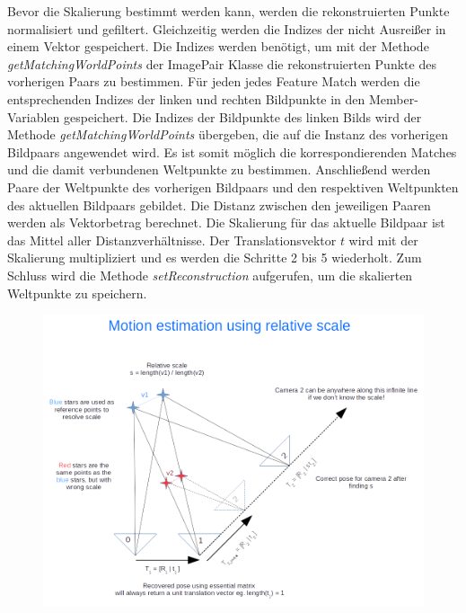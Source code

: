 Bevor die Skalierung bestimmt werden kann, werden die rekonstruierten Punkte normalisiert und gefiltert.
Gleichzeitig werden die Indizes der nicht Ausreißer in einem Vektor gespeichert. 
Die Indizes werden benötigt, um mit der Methode \emph{getMatchingWorldPoints} der ImagePair Klasse die rekonstruierten Punkte des vorherigen Paars zu bestimmen.
Für jeden jedes Feature Match werden die entsprechenden Indizes der linken und rechten Bildpunkte in den Member-Variablen gespeichert.
Die Indizes der Bildpunkte des linken Bilds wird der Methode \emph{getMatchingWorldPoints} übergeben, die auf die Instanz des vorherigen Bildpaars angewendet wird.
Es ist somit möglich die korrespondierenden Matches und die damit verbundenen Weltpunkte zu bestimmen.
Anschließend werden Paare der Weltpunkte des vorherigen Bildpaars und den respektiven Weltpunkten des aktuellen Bildpaars gebildet.
Die Distanz zwischen den jeweiligen Paaren werden als Vektorbetrag berechnet.
Die Skalierung für das aktuelle Bildpaar ist das Mittel aller Distanzverhältnisse.
Der Translationsvektor $t$ wird mit der Skalierung multipliziert und es werden die Schritte 2 bis 5 wiederholt.
Zum Schluss wird die Methode \emph{setReconstruction} aufgerufen, um die skalierten Weltpunkte zu speichern.
\begin{figure}
    \includegraphics[width=\textwidth]{src/img/nghiaho_2017_sfm_scaling}
    \caption{~\cite{nghiaho_2017}}
    \label{fig:sfm-scaling}
\end{figure}
